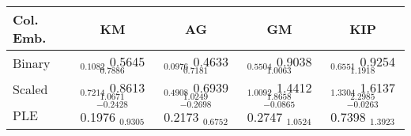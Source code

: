 \begin{tabular}{lcccc}
\toprule
Col. Emb. & KM & AG & GM & KIP \\
\midrule
Binary & $_{0.1082}$ 0.5645 $_{0.7886}$ & $_{0.0976}$ 0.4633 $_{0.7181}$ & $_{0.5504}$ 0.9038 $_{1.0063}$ & $_{0.6551}$ 0.9254 $_{1.1918}$ \\
Scaled & $_{0.7214}$ 0.8613 $_{1.0671}$ & $_{0.4908}$ 0.6939 $_{1.0249}$ & $_{1.0092}$ 1.4412 $_{1.8658}$ & $_{1.3304}$ 1.6137 $_{2.2985}$ \\
PLE & $_{-0.2428}$ 0.1976 $_{0.9305}$ & $_{-0.2698}$ 0.2173 $_{0.6752}$ & $_{-0.0865}$ 0.2747 $_{1.0524}$ & $_{-0.0263}$ 0.7398 $_{1.3923}$ \\
\bottomrule
\end{tabular}
